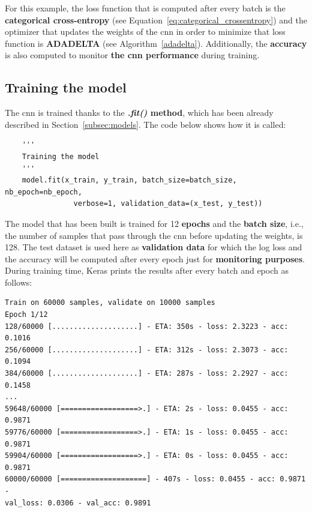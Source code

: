 For this example, the loss function that is computed after every batch is the \textbf{categorical cross-entropy} (see Equation~\ref{eq:categorical_crossentropy}) and the optimizer that updates the weights of the \gls{cnn} in order to minimize that loss function is \textbf{ADADELTA} (see Algorithm~\ref{adadelta}). Additionally, the \textbf{accuracy} is also computed to monitor \textbf{the \gls{cnn} performance} during training.

\subsection{Training the model}
The \gls{cnn} is trained thanks to the \textbf{\textit{.fit()} method}, which has been already described in Section~\ref{subsec:models}. The code below shows how it is called:
\begin{lstlisting}
    '''
    Training the model
    '''
    model.fit(x_train, y_train, batch_size=batch_size, nb_epoch=nb_epoch,
			    verbose=1, validation_data=(x_test, y_test))
\end{lstlisting}

The model that has been built is trained for 12 \textbf{epochs} and the \textbf{batch size}, i.e., the number of samples that pass through the \gls{cnn} before updating the weights, is 128. The test dataset is used here as \textbf{validation data} for which the log loss and the accuracy will be computed after every epoch just for \textbf{monitoring purposes}. During training time, Keras prints the results after every batch and epoch as follows:
\begin{Verbatim}[frame=single]
Train on 60000 samples, validate on 10000 samples
Epoch 1/12
128/60000 [....................] - ETA: 350s - loss: 2.3223 - acc: 0.1016
256/60000 [....................] - ETA: 312s - loss: 2.3073 - acc: 0.1094
384/60000 [....................] - ETA: 287s - loss: 2.2927 - acc: 0.1458
...
59648/60000 [==================>.] - ETA: 2s - loss: 0.0455 - acc: 0.9871
59776/60000 [==================>.] - ETA: 1s - loss: 0.0455 - acc: 0.9871
59904/60000 [==================>.] - ETA: 0s - loss: 0.0455 - acc: 0.9871
60000/60000 [====================] - 407s - loss: 0.0455 - acc: 0.9871 - 
val_loss: 0.0306 - val_acc: 0.9891
\end{Verbatim}

